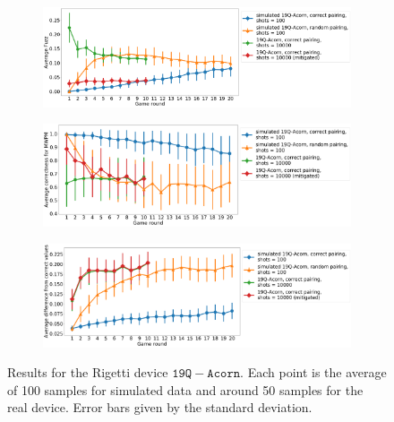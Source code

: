 \documentclass[aps,prl,twocolumn,showpacs,preprintnumbers]{revtex4-1}
\begin{document}
\begin{figure}
    \centering
    \begin{subfigure}[b]{\textwidth}
        \includegraphics[width=\textwidth]{figures/acorn_fuzz.png}
    \end{subfigure}
    \begin{subfigure}[b]{\textwidth}
        \includegraphics[width=\textwidth]{figures/acorn_mwpm.png}
    \end{subfigure}
    \begin{subfigure}[b]{\textwidth}
        \includegraphics[width=\textwidth]{figures/acorn_diff.png}
    \end{subfigure}
    \caption{Results for the Rigetti device $\mathtt{19Q-Acorn}$. Each point is the average of 100 samples for simulated data and around 50 samples for the real device. Error bars given by the standard deviation.}\label{fig:acorn}
\end{figure}
\pagebreak
\end{document}
